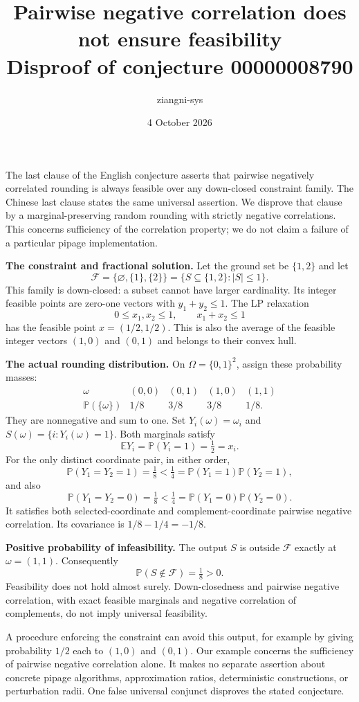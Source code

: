 \documentclass[11pt]{article}
\title{Pairwise negative correlation does not ensure feasibility\\
\large Disproof of conjecture 00000008790}
\author{ziangni-sys}
\date{4 October 2026}
\begin{document}
\maketitle
The last clause of the English conjecture asserts that pairwise negatively
correlated rounding is always feasible over any down-closed constraint
family. The Chinese last clause states the same universal assertion.
We disprove that clause by a marginal-preserving random rounding with
strictly negative correlations. This concerns sufficiency of the correlation
property; we do not claim a failure of a particular pipage implementation.

\textbf{The constraint and fractional solution.}
Let the ground set be $\{1,2\}$ and let
\[
 \mathcal F=\{\varnothing,\{1\},\{2\}\}
          =\{S\subseteq\{1,2\}:|S|\leq1\}.
\]
This family is down-closed: a subset cannot have larger cardinality.
Its integer feasible points are zero-one vectors with $y_1+y_2\leq1$.
The LP relaxation
\[
 0\leq x_1,x_2\leq1,\qquad x_1+x_2\leq1
\]
has the feasible point $x=(1/2,1/2)$. This is also the average of the
feasible integer vectors $(1,0)$ and $(0,1)$ and belongs to their convex hull.

\textbf{The actual rounding distribution.}
On $\Omega=\{0,1\}^2$, assign these probability masses:
\[
\begin{array}{c|rrrr}
\omega &(0,0)&(0,1)&(1,0)&(1,1)\\ \hline
\mathbb P(\{\omega\})&1/8&3/8&3/8&1/8 .
\end{array}
\]
They are nonnegative and sum to one. Set $Y_i(\omega)=\omega_i$ and
$S(\omega)=\{i:Y_i(\omega)=1\}$. Both marginals satisfy
\[
 \mathbb E Y_i=\mathbb P(Y_i=1)=\tfrac12=x_i.
\]
For the only distinct coordinate pair, in either order,
\[
 \mathbb P(Y_1=Y_2=1)=\tfrac18
       <\tfrac14=\mathbb P(Y_1=1)\mathbb P(Y_2=1),
\]
and also
\[
 \mathbb P(Y_1=Y_2=0)=\tfrac18
       <\tfrac14=\mathbb P(Y_1=0)\mathbb P(Y_2=0).
\]
It satisfies both selected-coordinate and complement-coordinate pairwise
negative correlation. Its covariance is $1/8-1/4=-1/8$.

\newpage
\textbf{Positive probability of infeasibility.}
The output $S$ is outside $\mathcal F$ exactly at $\omega=(1,1)$.
Consequently
\[
 \mathbb P(S\notin\mathcal F)=\tfrac18>0.
\]
Feasibility does not hold almost surely. Down-closedness and pairwise
negative correlation, with exact feasible marginals and negative
correlation of complements, do not imply universal feasibility.

A procedure enforcing the constraint can avoid this output, for example
by giving probability $1/2$ each to $(1,0)$ and $(0,1)$. Our example concerns
the sufficiency of pairwise negative correlation alone. It makes no
separate assertion about concrete pipage algorithms, approximation
ratios, deterministic constructions, or perturbation radii. One false
universal conjunct disproves the stated conjecture.
\end{document}
